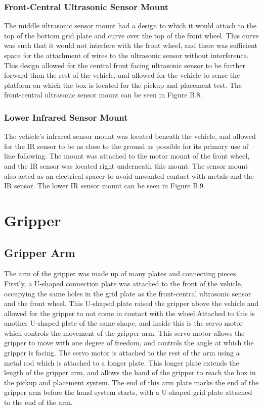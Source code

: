 \documentclass[11pt]{report}
\begin{document}
\subsubsection{Front-Central Ultrasonic Sensor Mount}
The middle ultrasonic sensor mount had a design to which it would attach to the top of the bottom grid plate and curve over the top of the front wheel. This curve was such that it would not interfere with the front wheel, and there was sufficient space for the attachment of wires to the ultrasonic sensor without interference. This design allowed for the central front facing ultrasonic sensor to be further forward than the rest of the vehicle, and allowed for the vehicle to sense the platform on which the box is located for the pickup and placement test. The front-central ultrasonic sensor mount can be seen in Figure B.8.

\subsubsection{Lower Infrared Sensor Mount}
The vehicle’s infrared sensor mount was located beneath the vehicle, and allowed for the \gls{IR} sensor to be as close to the ground as possible for its primary use of line following. The mount was attached to the motor mount of the front wheel, and the \gls{IR} sensor was located right underneath this mount. The sensor mount also acted as an electrical spacer to avoid unwanted contact with metals and the \gls{IR} sensor. The lower \gls{IR} sensor mount can be seen in Figure B.9. 

\section{Gripper}\label{sec:gripper}
\subsection{Gripper Arm}
The arm of the gripper was made up of many plates and connecting pieces. Firstly, a U-shaped connection plate was attached to the front of the vehicle, occupying the same holes in the grid plate as the front-central ultrasonic sensor and the front wheel. This U-shaped plate raised the gripper above the vehicle and allowed for the gripper to not come in contact with the wheel.Attached to this is another U-shaped plate of the same shape, and inside this is the servo motor which controls the movement of the gripper arm. This servo motor allows the gripper to move with one degree of freedom, and controls the angle at which the gripper is facing. The servo motor is attached to the rest of the arm using a metal rod which is attached to a longer plate. This longer plate extends the length of the gripper arm, and allows the hand of the gripper to reach the box in the pickup and placement system. The end of this arm plate marks the end of the gripper arm before the hand system starts, with a U-shaped grid plate attached to the end of the arm. 
\end{document}
